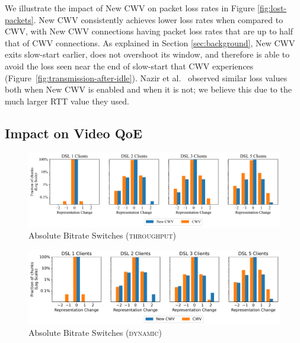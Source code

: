 \documentclass[10pt,sigconf]{acmart}
\begin{document}
We illustrate the impact of New CWV on packet loss rates in Figure \ref{fig:lost-packets}. New CWV consistently achieves lower loss rates when compared to CWV, with New CWV connections having packet loss rates that are up to half that of CWV connections. As explained in Section \ref{sec:background}, New CWV exits slow-start earlier, does not overshoot its window, and therefore is able to avoid the loss seen near the end of slow-start that CWV experiences (Figure~\ref{fig:transmission-after-idle}). Nazir et al.~\cite{Nazir-2014-performance-evaluation-congestion-window-validation-dash-newcwv} observed similar loss values both when New CWV is enabled and when it is not; we believe this due to the much larger RTT value they used.


\subsection{Impact on Video QoE}
\label{sec:QoE-impact}

\begin{figure}
  \centering
  \includegraphics[width=\textwidth, keepaspectratio]{figures/bitrate_derivative_distribution.pdf}
  \caption{Absolute Bitrate Switches (\textsc{throughput})}
  \label{fig:bitrate-switches}
\end{figure}

\begin{figure}
  \centering
  \includegraphics[width=\textwidth, keepaspectratio]{figures/bitrate_derivative_distribution_dynamic.pdf}
  \caption{Absolute Bitrate Switches (\textsc{dynamic})}
  \label{fig:bitrate-switches-dynamic}
\end{figure}
\end{document}
